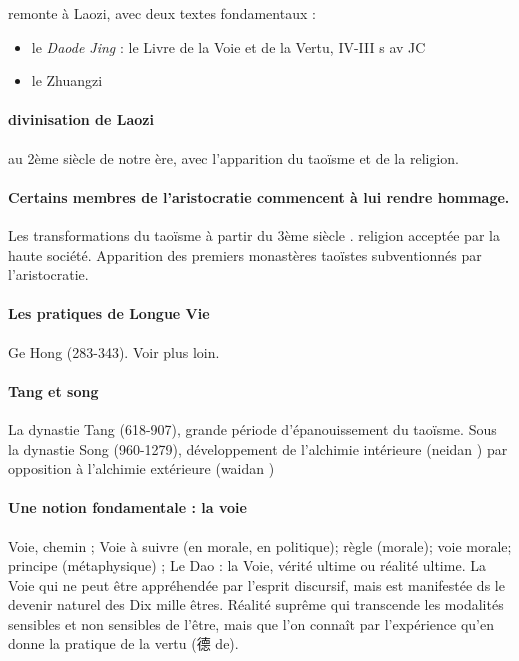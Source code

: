 \begin{Def}[daojiao 道教]
    remonte à Laozi, avec deux textes fondamentaux : 
    \begin{itemize}
        \item le \textit{Daode Jing} : le Livre de la Voie et de la Vertu, IV-III s av JC
        \item le Zhuangzi
    \end{itemize}
\end{Def}

\paragraph{divinisation de Laozi} au 2ème siècle de notre ère, avec l'apparition du taoïsme et de la religion. 

\paragraph{Certains membres de l'aristocratie commencent à lui rendre hommage.}
Les transformations du taoïsme à partir du 3ème siècle . religion acceptée par la haute société. Apparition des premiers monastères taoïstes subventionnés par l’aristocratie.

\paragraph{Les pratiques de Longue Vie}   Ge Hong (283-343). Voir plus loin.


\paragraph{Tang et song} La dynastie Tang (618-907), grande période d’épanouissement du taoïsme.
 Sous la dynastie Song (960-1279), développement de l’alchimie intérieure (neidan  ) par opposition à l’alchimie extérieure (waidan   )

\paragraph{Une notion fondamentale : la voie}
\begin{Def}[dao 道]
    Voie, chemin ; Voie à suivre (en morale, en politique); règle (morale); voie morale; principe (métaphysique) ;      Le Dao : la Voie, vérité ultime ou réalité ultime. La Voie qui ne peut être appréhendée par l’esprit discursif, mais est manifestée ds le devenir naturel des Dix mille êtres. Réalité suprême qui transcende les modalités sensibles et non sensibles de l’être, mais que l’on connaît par l’expérience qu’en donne la pratique de la vertu (德 de).
\end{Def}

